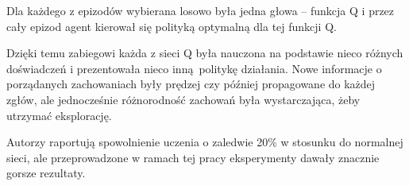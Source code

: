 Dla każdego z epizodów wybierana losowo była jedna głowa – funkcja Q i przez cały epizod agent kierował się polityką optymalną dla tej funkcji Q.

Dzięki temu zabiegowi każda z sieci Q była nauczona na podstawie nieco różnych doświadczeń i prezentowała nieco inną politykę działania. Nowe informacje o porządanych zachowaniach były prędzej czy później propagowane do każdej zgłów, ale jednocześnie różnorodność zachowań była wystarczająca, żeby utrzymać eksplorację.

Autorzy raportują spowolnienie uczenia o zaledwie 20\% w stosunku do normalnej sieci, ale przeprowadzone w ramach tej pracy eksperymenty dawały znacznie gorsze rezultaty.
